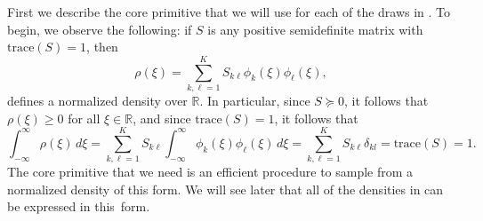 First we describe the core primitive that we will use for each of the draws in
.
To begin, we observe the following: if $S$ is any positive semidefinite matrix with $\text{trace}(S)\!=\!1$, then
\begin{equation}
\rho(\xi) = \sum_{k,\ell=1}^K S_{k\ell} \phi_k(\xi)\phi_\ell(\xi),
\label{eq:psd-density}
\end{equation}
defines a normalized density over $\mathbb{R}$. In particular, since $S\succeq 0$, it follows that $\rho(\xi)\!\geq\! 0$ for all $\xi\!\in\!\mathbb{R}$, and since $\text{trace}(S)\!=\!1$, it follows that
\begin{equation}
\int_{-\infty}^\infty\!\! \rho(\xi)\, d\xi
  = \sum_{k,\ell=1}^K S_{k\ell} \int_{-\infty}^\infty\!\! \phi_k(\xi)\phi_\ell(\xi)\, d\xi
  = \sum_{k,\ell=1}^K S_{k\ell} \delta_{kl}
  = \text{trace}(S)
  = 1.
\end{equation}
The core primitive that we need is an efficient procedure to sample
from a normalized density of this form. We will see later that all of the densities
in
can be expressed in this~form.


